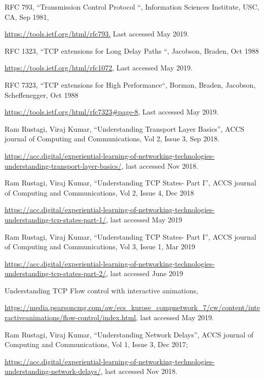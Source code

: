 \begin{multicols}{2}
\begin{thebibliography}{99}
RFC 793, “Transmission Control Protocol “, Information Sciences Institute, USC, CA, Sep 1981,

 \url{https://tools.ietf.org/html/rfc793.} Last accessed May 2019.

  RFC 1323, “TCP extensions for Long Delay Paths “, Jacobson, Braden, Oct 1988 

\url{https://tools.ietf.org/html/rfc1072}, Last accessed May 2019.

 RFC 7323, “TCP extensions for High Performance“, Borman, Braden, Jacobson, Scheffenegger, Oct 1988 

\url{https://tools.ietf.org/html/rfc7323#page-8}, Last accessed May 2019.

 Ram Rustagi, Viraj Kumar, “Understanding Transport Layer Basics”, ACCS journal of Computing and Communications, Vol 2, Issue 3, Sep 2018. 

\url{https://acc.digital/experiential-learning-of-networking-technologies-understanding-transport-layer-basics/}, last accessed Nov 2018.

Ram Rustagi, Viraj Kumar, “Understanding TCP States- Part I”, ACCS journal of Computing and Communications, Vol 2, Issue 4, Dec 2018 

\url{https://acc.digital/experiential-learning-of-networking-technologies-understanding-tcp-states-part-1/}, last accessed May 2019

Ram Rustagi, Viraj Kumar, “Understanding TCP States- Part I”, ACCS journal of Computing and Communications, Vol 3, Issue 1, Mar 2019

 \url{https://acc.digital/experiential-learning-of-networking-technologies-understanding-tcp-states-part-2/}, last accessed June 2019

 Understanding TCP Flow control with interactive animations,

 \url{https://media.pearsoncmg.com/aw/ecs_kurose_compnetwork_7/cw/content/interactiveanimations/flow-control/index.html}, last accessed May 2019.

 Ram Rustagi, Viraj Kumar, “Understanding Network Delays”, ACCS journal of Computing and Communications, Vol 1, Issue 3, Dec 2017;  

\url{https://acc.digital/experiential-learning-of-networking-technologies-understanding-network-delays/}, last accessed Nov 2018.


\end{thebibliography}
\end{multicols}
